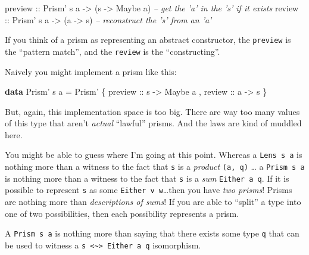 \documentclass[]{article}
\newenvironment{Shaded}{}{}
\newcommand{\CommentTok}[1]{\textcolor[rgb]{0.38,0.63,0.69}{\textit{#1}}}
\newcommand{\DataTypeTok}[1]{\textcolor[rgb]{0.56,0.13,0.00}{#1}}
\newcommand{\FunctionTok}[1]{\textcolor[rgb]{0.02,0.16,0.49}{#1}}
\newcommand{\KeywordTok}[1]{\textcolor[rgb]{0.00,0.44,0.13}{\textbf{#1}}}
\newcommand{\NormalTok}[1]{#1}
\newcommand{\OtherTok}[1]{\textcolor[rgb]{0.00,0.44,0.13}{#1}}
\begin{document}
\begin{Shaded}
\begin{Highlighting}[]
\OtherTok{preview ::} \DataTypeTok{Prism'}\NormalTok{ s a }\OtherTok{->}\NormalTok{ (s }\OtherTok{->} \DataTypeTok{Maybe}\NormalTok{ a)   }\CommentTok{-- get the 'a' in the 's' if it exists}
\OtherTok{review  ::} \DataTypeTok{Prism'}\NormalTok{ s a }\OtherTok{->}\NormalTok{ (a }\OtherTok{->}\NormalTok{ s)         }\CommentTok{-- reconstruct the 's' from an 'a'}
\end{Highlighting}
\end{Shaded}

If you think of a prism as representing an abstract constructor, the
\texttt{preview} is the ``pattern match'', and the \texttt{review} is the
``constructing''.

Naively you might implement a prism like this:

\begin{Shaded}
\begin{Highlighting}[]
\KeywordTok{data} \DataTypeTok{Prism'}\NormalTok{ s a }\FunctionTok{=} \DataTypeTok{Prism'}
\NormalTok{    \{}\OtherTok{ preview ::}\NormalTok{ s }\OtherTok{->} \DataTypeTok{Maybe}\NormalTok{ a}
\NormalTok{    ,}\OtherTok{ review  ::}\NormalTok{ a }\OtherTok{->}\NormalTok{ s}
\NormalTok{    \}}
\end{Highlighting}
\end{Shaded}

But, again, this implementation space is too big. There are way too many values
of this type that aren't \emph{actual} ``lawful'' prisms. And the laws are kind
of muddled here.

You might be able to guess where I'm going at this point. Whereas a
\texttt{Lens\textquotesingle{}\ s\ a} is nothing more than a witness to the fact
that \texttt{s} is a \emph{product} \texttt{(a,\ q)} \ldots{} a
\texttt{Prism\textquotesingle{}\ s\ a} is nothing more than a witness to the
fact that \texttt{s} is a \emph{sum} \texttt{Either\ a\ q}. If it is possible to
represent \texttt{s} as some \texttt{Either\ v\ w}\ldots{}then you have
\emph{two prisms}! Prisms are nothing more than \emph{descriptions of sums}! If
you are able to ``split'' a type into one of two possibilities, then each
possibility represents a prism.

A \texttt{Prism\textquotesingle{}\ s\ a} is nothing more than saying that there
exists some type \texttt{q} that can be used to witness a
\texttt{s\ \textless{}\textasciitilde{}\textgreater{}\ Either\ a\ q}
isomorphism.
\end{document}
